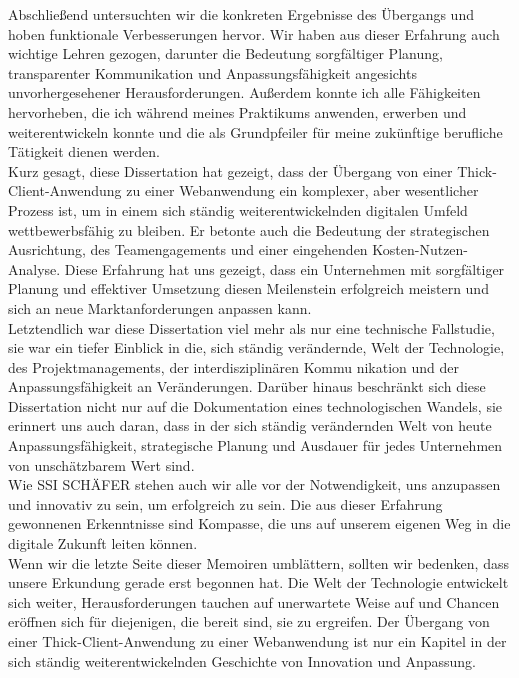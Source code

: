 \documentclass[a4paper, 12pt, french]{article}
\begin{document}
		Abschließend untersuchten wir die konkreten Ergebnisse des Übergangs und hoben funktionale Verbesserungen hervor. Wir haben aus dieser Erfahrung auch wichtige Lehren gezogen, darunter die Bedeutung sorgfältiger Planung, transparenter Kommunikation und Anpassungsfähigkeit angesichts unvorhergesehener Herausforderungen. Außerdem konnte ich alle Fähigkeiten hervorheben, die ich während meines Praktikums anwenden, erwerben und weiterentwickeln konnte und die als Grundpfeiler für meine zukünftige berufliche Tätigkeit dienen werden.\\

		Kurz gesagt, diese Dissertation hat gezeigt, dass der Übergang von einer Thick-Client-Anwendung zu einer Webanwendung ein komplexer, aber wesentlicher Prozess ist, um in einem sich ständig weiterentwickelnden digitalen Umfeld wettbewerbsfähig zu bleiben. Er betonte auch die Bedeutung der strategischen Ausrichtung, des Teamengagements und einer eingehenden Kosten-Nutzen-Analyse. Diese Erfahrung hat uns gezeigt, dass ein Unternehmen mit sorgfältiger Planung und effektiver Umsetzung diesen Meilenstein erfolgreich meistern und sich an neue Marktanforderungen anpassen kann.\\

		Letztendlich war diese Dissertation viel mehr als nur eine technische Fallstudie, sie war ein tiefer Einblick in die, sich ständig verändernde, Welt  der Technologie, des Projektmanagements, der interdisziplinären Kommu nikation und der Anpassungsfähigkeit an Veränderungen. Darüber hinaus  beschränkt sich diese Dissertation nicht nur auf die Dokumentation eines  technologischen Wandels, sie erinnert uns auch daran, dass in der sich ständig verändernden Welt von heute Anpassungsfähigkeit, strategische Planung und Ausdauer für jedes Unternehmen von unschätzbarem Wert sind.\\

		Wie SSI SCHÄFER stehen auch wir alle vor der Notwendigkeit, uns anzupassen und innovativ zu sein, um erfolgreich zu sein. Die aus dieser Erfahrung gewonnenen Erkenntnisse sind Kompasse, die uns auf unserem eigenen Weg in die digitale Zukunft leiten können.\\

		Wenn wir die letzte Seite dieser Memoiren umblättern, sollten wir bedenken, dass unsere Erkundung gerade erst begonnen hat. Die Welt der Technologie entwickelt sich weiter, Herausforderungen tauchen auf unerwartete Weise auf und Chancen eröffnen sich für diejenigen, die bereit sind, sie zu ergreifen. Der Übergang von einer Thick-Client-Anwendung zu einer Webanwendung ist nur ein Kapitel in der sich ständig weiterentwickelnden Geschichte von Innovation und Anpassung.
\end{document}
